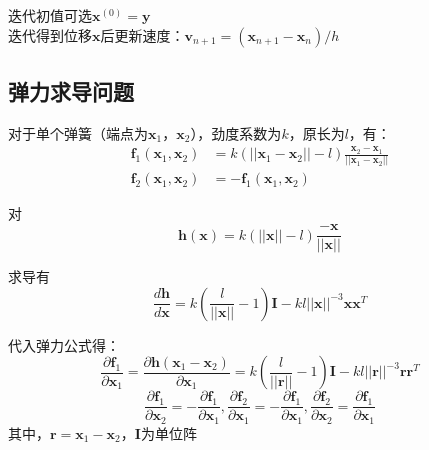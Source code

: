 \documentclass[14pt]{scrartcl} %
\begin{document}
迭代初值可选$\boldsymbol x^{(0)}=\boldsymbol y$\\
迭代得到位移$\boldsymbol x$后更新速度：$\boldsymbol v_{n+1}=(\boldsymbol x_{n+1}-\boldsymbol x_n)/h$

\pagebreak
\subsection{弹力求导问题}
对于单个弹簧（端点为$\boldsymbol  x_1$，$\boldsymbol  x_2$），劲度系数为$k$，原长为$l$，有：
\begin{equation}
\begin{aligned}
\boldsymbol f_1(\boldsymbol x_1,\boldsymbol x_2)&=k(||\boldsymbol x_1-\boldsymbol x_2||-l)\frac{\boldsymbol x_2-\boldsymbol x_1}{||\boldsymbol x_1-\boldsymbol x_2||}\\
\boldsymbol f_2(\boldsymbol x_1,\boldsymbol x_2)&=-\boldsymbol f_1(\boldsymbol x_1,\boldsymbol x_2)
\end{aligned}
\end{equation}

对
\begin{equation}
\boldsymbol h(\boldsymbol x)=k(||\boldsymbol x||-l)\frac{-\boldsymbol x}{||\boldsymbol x||}
\end{equation}

求导有
\begin{equation}
\frac{ d  \boldsymbol h}{d \boldsymbol x} = k(\frac{l}{||\boldsymbol x||}-1)\boldsymbol I-kl||\boldsymbol x||^{-3}\boldsymbol x \boldsymbol x^T
\end{equation}

代入弹力公式得：
\begin{equation}
\frac{\partial  \boldsymbol f_1}{\partial \boldsymbol x_1} =\frac{\partial  \boldsymbol h(\boldsymbol x_1-\boldsymbol x_2)}{\partial \boldsymbol x_1}=k(\frac{l}{||\boldsymbol r||}-1)\boldsymbol I-kl||\boldsymbol r||^{-3}\boldsymbol r \boldsymbol r^T
\end{equation}
\begin{equation}
\frac{\partial  \boldsymbol f_1}{\partial \boldsymbol x_2}=-\frac{\partial  \boldsymbol f_1}{\partial \boldsymbol x_1},
\frac{\partial  \boldsymbol f_2}{\partial \boldsymbol x_1}=-\frac{\partial  \boldsymbol f_1}{\partial \boldsymbol x_1},
\frac{\partial  \boldsymbol f_2}{\partial \boldsymbol x_2}=\frac{\partial  \boldsymbol f_1}{\partial \boldsymbol x_1}
\end{equation}
其中，$\boldsymbol r=\boldsymbol  x_1-\boldsymbol x_2$，$\boldsymbol I$为单位阵\\
\end{document}
